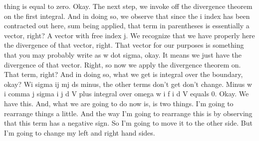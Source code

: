 \documentclass[10pt]{article}
\begin{document}
thing is equal to zero. Okay. The next step, we invoke off the divergence theorem on the first integral. And in doing so, we observe that since the i index has been contracted out here, sum being applied, that term in parentheses is essentially a vector, right? A vector with free index j. We recognize that we have properly here the divergence of that vector, right. That vector for our purposes is something that you may probably write as w dot sigma, okay. It means we just have the divergence of that vector. Right, so now we apply the divergence theorem on. That term, right? And in doing so, what we get is integral over the boundary, okay? Wi sigma ij mj ds minus, the other terms don't get don't change. Minus w i comma j sigma i j d V plus integral over omega w i f i d V equals 0. Okay. We have this. And, what we are going to do now is, is two things. I'm going to rearrange things a little. And the way I'm going to rearrange this is by observing that this term has a negative sign. So I'm going to move it to the other side. But I'm going to change my left and right hand sides.
\end{document}
